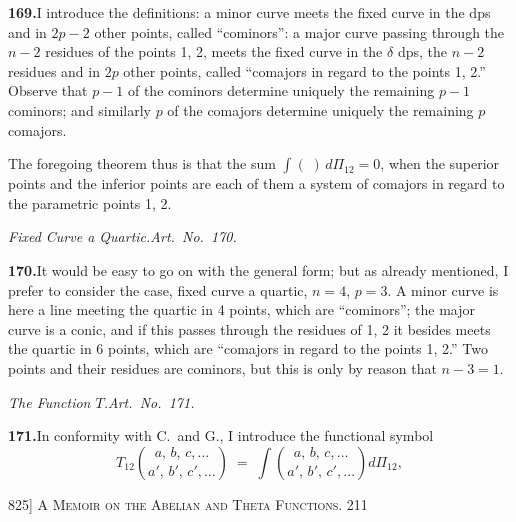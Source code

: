 \documentclass[11pt]{article}
\begin{document}
\medskip
\textbf{169.}\quad I introduce the definitions: a minor curve meets the fixed curve in the
dps and in $2p-2$ other points, called ``cominors'': a major curve passing through
the $n-2$ residues of the points 1, 2, meets the fixed curve in the $\delta$ dps, the $n-2$
residues and in $2p$ other points, called ``comajors in regard to the points 1, 2.''
Observe that $p-1$ of the cominors determine uniquely the remaining $p-1$ cominors;
and similarly $p$ of the comajors determine uniquely the remaining $p$ comajors.

The foregoing theorem thus is that the sum $\displaystyle\int\!(\;)\,d\Pi_{12} = 0$, when the superior
points and the inferior points are each of them a system of comajors in regard to
the parametric points 1, 2.

\bigskip
\begin{center}\textit{Fixed Curve a Quartic.\quad Art.\ No.\ 170.}\end{center}

\textbf{170.}\quad It would be easy to go on with the general form; but as already mentioned,
I prefer to consider the case, fixed curve a quartic, $n=4$, $p=3$.  A minor curve is
here a line meeting the quartic in 4 points, which are ``cominors''; the major curve
is a conic, and if this passes through the residues of 1, 2 it besides meets the
quartic in 6 points, which are ``comajors in regard to the points 1, 2.''  Two points
and their residues are cominors, but this is only by reason that $n-3=1$.

\bigskip
\begin{center}\textit{The Function $T$.\quad Art.\ No.\ 171.}\end{center}

\textbf{171.}\quad In conformity with C.\ and G., I introduce the functional symbol
\[
T_{12}\binom{a,\,b,\,c,\ldots}{a',\,b',\,c',\ldots} \;=\; \int\!\binom{a,\,b,\,c,\ldots}{a',\,b',\,c',\ldots}d\Pi_{12},
\]

\newpage
\noindent\textsc{825] \hfill A Memoir on the Abelian and Theta Functions. \hfill 211}
\vspace{0.6em}
\end{document}
